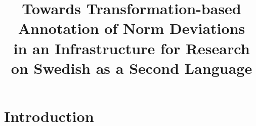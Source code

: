 \documentclass[10pt, a4paper]{article}
\title{Towards Transformation-based Annotation of Norm Deviations \\ in an Infrastructure for Research on Swedish as a Second Language}
\newcommand{\elena}[1]{{\color{BrickRed}{Elena: #1}}}
\newcommand{\mats}[1]{{\color{Blue}{Mats: #1}}}
\begin{document}
\maketitleabstract

\section{Introduction}








\end{document}
